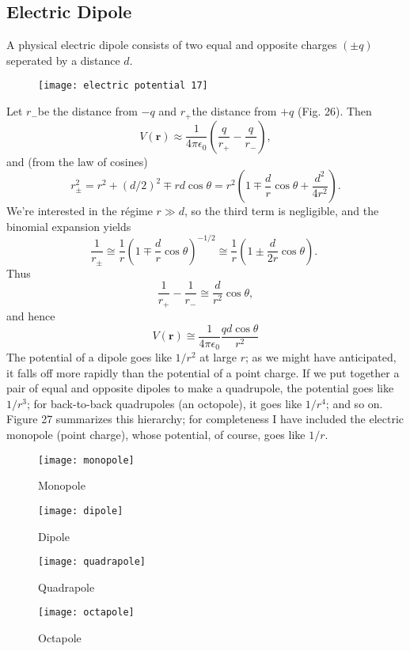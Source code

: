 \subsection{Electric Dipole}
 A physical electric dipole consists of two equal and opposite charges $(\pm q)$ seperated by a distance $d$. 
\begin{figure}[H]
	\centering
	\texttt{[image: electric potential 17]}
	\caption{}
	\label{}
\end{figure}
Let $r_{-}$be the distance from $-q$ and $r_{+}$the distance from $+q$ (Fig. 26). Then
$$
V(\mathbf{r})\approx\frac{1}{4 \pi \epsilon_{0}}\left(\frac{q}{r_{+}}-\frac{q}{r_{-}}\right),
$$
and (from the law of cosines)
$$
r_{\pm}^{2}=r^{2}+(d / 2)^{2} \mp r d \cos \theta=r^{2}\left(1 \mp \frac{d}{r} \cos \theta+\frac{d^{2}}{4 r^{2}}\right) .
$$
We're interested in the régime $r \gg d$, so the third term is negligible, and the binomial expansion yields
$$
\frac{1}{r_{\pm}} \cong \frac{1}{r}\left(1 \mp \frac{d}{r} \cos \theta\right)^{-1 / 2} \cong \frac{1}{r}\left(1 \pm \frac{d}{2 r} \cos \theta\right) \text {. }
$$
Thus
$$
\frac{1}{r_{+}}-\frac{1}{r_{-}} \cong \frac{d}{r^{2}} \cos \theta,
$$
and hence
$$V(\mathbf{r}) \cong \frac{1}{4 \pi \epsilon_{0}} \frac{q d \cos \theta}{r^{2}}$$
The potential of a dipole goes like $1 / r^{2}$ at large $r$; as we might have anticipated, it falls off more rapidly than the potential of a point charge. If we put together a pair of equal and opposite dipoles to make a quadrupole, the potential goes like $1 / r^{3}$; for back-to-back quadrupoles (an octopole), it goes like $1 / r^{4}$; and so on. Figure 27 summarizes this hierarchy; for completeness I have included the electric monopole (point charge), whose potential, of course, goes like $1 / r$.
\begin{figure}[H]
	\begin{minipage}{0.24\textwidth}
		\texttt{[image: monopole]}
		\caption{Monopole}
	\end{minipage}
	\begin{minipage}{0.24\textwidth}
		\texttt{[image: dipole]}
		\caption{Dipole}
	\end{minipage}
	\begin{minipage}{0.24\textwidth}
		\texttt{[image: quadrapole]}
		\caption{Quadrapole}
	\end{minipage}
	\begin{minipage}{0.24\textwidth}
		\texttt{[image: octapole]}
		\caption{Octapole}
	\end{minipage}
\end{figure}
